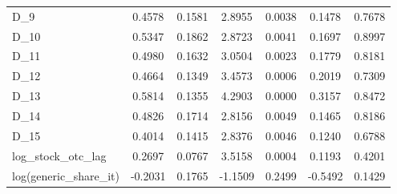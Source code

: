 \documentclass[a4paper,11pt,uplatex]{jsarticle}
\theoremstyle{definition}
\begin{document}
\begin{appendices}
\begin{table}[H]
\begin{tabular}{lcccccc}
        D\_9 & 0.4578 & 0.1581 & 2.8955 & 0.0038 & 0.1478 & 0.7678 \\
        D\_10 & 0.5347 & 0.1862 & 2.8723 & 0.0041 & 0.1697 & 0.8997 \\
        D\_11 & 0.4980 & 0.1632 & 3.0504 & 0.0023 & 0.1779 & 0.8181 \\
        D\_12 & 0.4664 & 0.1349 & 3.4573 & 0.0006 & 0.2019 & 0.7309 \\
        D\_13 & 0.5814 & 0.1355 & 4.2903 & 0.0000 & 0.3157 & 0.8472 \\
        D\_14 & 0.4826 & 0.1714 & 2.8156 & 0.0049 & 0.1465 & 0.8186 \\
        D\_15 & 0.4014 & 0.1415 & 2.8376 & 0.0046 & 0.1240 & 0.6788 \\
        log\_stock\_otc\_lag & 0.2697 & 0.0767 & 3.5158 & 0.0004 & 0.1193 & 0.4201 \\
        log(generic\_share\_it) & -0.2031 & 0.1765 & -1.1509 & 0.2499 & -0.5492 & 0.1429 \\
        \hline
        \end{tabular}
        \end{table}
        

\end{appendices}
\end{document}

